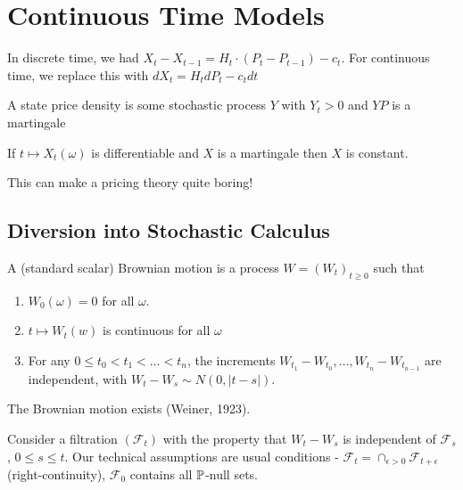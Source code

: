 \chapter{Continuous Time Models}
\label{cha:cont-time-models}

In discrete time, we had $X_{t} - X_{t-1} = H_{t} \cdot (P_{t} -
P_{t-1}) - c_{t}$.  For continuous time, we replace this with $dX_{t}
= H_{t} dP_{t} - c_{t} dt$

A state price density is some stochastic process
$Y$ with $Y_{t} > 0$ and $YP$ is a martingale

\begin{lem}
  If $t \mapsto X_{t}(\omega)$ is differentiable and $X$ is a
  martingale then $X$ is constant.
\end{lem}

This can make a pricing theory quite boring!

\newcommand{\ito}{It\^o\xspace}
\section{Diversion into Stochastic Calculus}
\label{sec:divers-into-stoch}

\begin{defn}
  \label{defn:continuous_time:1}
  A (standard scalar) Brownian motion is a process $W = (W_{t})_{t
    \geq 0}$ such that
  \begin{enumerate}
  \item $W_{0}(\omega) = 0$ for all $\omega$.
  \item $t \mapsto W_{t}(w)$ is continuous for all $\omega$
  \item For any $0 \leq t_{0} < t_{1} < \dots < t_{n}$, the increments
    $W_{t_{1}} - W_{t_{0}}, \dots, W_{t_{n}} - W_{t_{n-1}}$ are
    independent, with $W_{t} - W_{s} \sim N(0, |t-s|)$.
  \end{enumerate}
\end{defn}

\begin{thm}
  \label{defn:continuous_time:1}
  The Brownian motion exists (Weiner, 1923).
\end{thm}


Consider a filtration $(\mathcal{F}_{t})$ with the property that
$W_{t} - W_{s}$ is independent of $\mathcal{F}_{s}$, $0 \leq s \leq
t$. Our technical assumptions are usual conditions - $\mathcal{F}_{t}
= \cap_{\epsilon > 0} \mathcal{F}_{t + \epsilon}$ (right-continuity),
$\mathcal{F}_{0}$ contains all $\Prob$-null sets.

